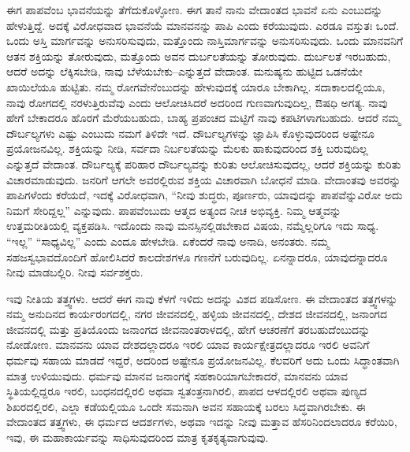 ಈಗ ಪಾಪವೆಂಬ ಭಾವನೆಯನ್ನು ತೆಗೆದುಕೊಳ್ಳೋಣ. ಈಗ ತಾನೆ ನಾನು ವೇದಾಂತದ ಭಾವನೆ ಏನು ಎಂಬುದನ್ನು ಹೇಳುತ್ತಿದ್ದೆ. ಅದಕ್ಕೆ ವಿರೋಧವಾದ ಭಾವನೆಯೆ ಮಾನವನನ್ನು ಪಾಪಿ ಎಂದು ಕರೆಯುವುದು. ಎರಡೂ ವಸ್ತುತಃ ಒಂದೆ. ಒಂದು ಅಸ್ತಿ ಮಾರ್ಗವನ್ನು ಅನುಸರಿಸುವುದು, ಮತ್ತೊಂದು ನಾಸ್ತಿಮಾರ್ಗವನ್ನು ಅನುಸರಿಸುವುದು. ಒಂದು ಮಾನವನಿಗೆ ಆತನ ಶಕ್ತಿಯನ್ನು ತೋರುವುದು, ಮತ್ತೊಂದು ಅವನ ದುರ್ಬಲತೆಯನ್ನು ತೋರುವುದು. ದುರ್ಬಲತೆ ಇರಬಹುದು, ಆದರೆ ಅದನ್ನು ಲೆಕ್ಕಿಸಬೇಡಿ, ನಾವು ಬೆಳೆಯಬೇಕು–ಎನ್ನುತ್ತದೆ ವೇದಾಂತ. ಮನುಷ್ಯನು ಹುಟ್ಟಿದ ಒಡನೆಯೇ ಖಾಯಿಲೆಯೂ ಹುಟ್ಟಿತು. ನಮ್ಮ ರೋಗವೇನೆಂಬುದನ್ನು ಹೇಳುವುದಕ್ಕೆ ಯಾರೂ ಬೇಕಾಗಿಲ್ಲ. ಸದಾಕಾಲದಲ್ಲಿಯೂ, ನಾವು ರೋಗದಲ್ಲಿ ನರಳುತ್ತಿರುವೆವು ಎಂದು ಆಲೋಚಿಸಿದರೆ ಅದರಿಂದ ಗುಣವಾಗುವುದಿಲ್ಲ, ಔಷಧಿ ಅಗತ್ಯ. ನಾವು ಹೇಗೆ ಬೇಕಾದರೂ ಹೊರಗೆ ಮೆರೆಯಬಹುದು, ಬಾಹ್ಯ ಪ್ರಪಂಚದ ಮಟ್ಟಿಗೆ ನಾವು ಕಪಟಿಗಳಾಗಬಹುದು. ಆದರೆ ನಮ್ಮ ದೌರ್ಬಲ್ಯಗಳು ಎಷ್ಟು ಎಂಬುದು ನಮಗೆ ತಿಳಿದೇ ಇದೆ. ದೌರ್ಬಲ್ಯಗಳನ್ನು ಜ್ಞಾಪಿಸಿ ಕೊಳ್ಳುವುದರಿಂದ ಅಷ್ಟೇನೂ ಪ್ರಯೋಜನವಿಲ್ಲ. ಶಕ್ತಿಯನ್ನು ನೀಡಿ, ಸರ್ವದಾ ನಿರ್ಬಲತೆಯನ್ನು ಮೆಲಕು ಹಾಕುವುದರಿಂದ ಶಕ್ತಿ ಬರುವುದಿಲ್ಲ ಎನ್ನುತ್ತದೆ ವೇದಾಂತ. ದೌರ್ಬಲ್ಯಕ್ಕೆ ಪರಿಹಾರ ದೌರ್ಬಲ್ಯವನ್ನು ಕುರಿತು ಆಲೋಚಿಸುವುದಲ್ಲ, ಆದರೆ ಶಕ್ತಿಯನ್ನು ಕುರಿತು ವಿಚಾರಮಾಡುವುದು. ಜನರಿಗೆ ಆಗಲೇ ಅವರಲ್ಲಿರುವ ಶಕ್ತಿಯ ವಿಚಾರವಾಗಿ ಬೋಧನೆ ಮಾಡಿ. ವೇದಾಂತವು ಅವರನ್ನು ಪಾಪಿಗಳೆಂದು ಕರೆಯದೆ, ಇದಕ್ಕೆ ವಿರೋಧವಾಗಿ, “ನೀವು ಶುದ್ಧರು, ಪೂರ್ಣರು, ಯಾವುದನ್ನು ಪಾಪವೆನ್ನುವಿರೋ ಅದು ನಿಮಗೆ ಸೇರಿದ್ದಲ್ಲ” ಎನ್ನುವುದು. ಪಾಪವೆಂಬುದು ಆತ್ಮದ ಅತ್ಯಂದ ನೀಚ ಅಭಿವ್ಯಕ್ತಿ. ನಿಮ್ಮ ಆತ್ಮವನ್ನು ಉತ್ತಮರೀತಿಯಲ್ಲಿ ವ್ಯಕ್ತಪಡಿಸಿ. ಇದೊಂದು ನಾವು ಮನಸ್ಸಿನಲ್ಲಿಡಬೇಕಾದ ವಿಷಯ, ನಮ್ಮೆಲ್ಲರಿಗೂ ಇದು ಸಾಧ್ಯ. “ಇಲ್ಲ” “ಸಾಧ್ಯವಿಲ್ಲ” ಎಂದು ಎಂದೂ ಹೇಳಬೇಡಿ. ಏಕೆಂದರೆ ನಾವು ಅನಾದಿ, ಅನಂತರು. ನಮ್ಮ ಸಹಜಸ್ವಭಾವದೊಂದಿಗೆ ಹೋಲಿಸಿದರೆ ಕಾಲದೇಶಗಳೂ ಗಣನೆಗೆ ಬರುವುದಿಲ್ಲ. ಏನನ್ನಾದರೂ, ಯಾವುದನ್ನಾದರೂ ನೀವು ಮಾಡಬಲ್ಲಿರಿ. ನೀವು ಸರ್ವಶಕ್ತರು. 

\vskip 9pt

ಇವು ನೀತಿಯ ತತ್ತ್ವಗಳು. ಆದರೆ ಈಗ ನಾವು ಕೆಳಗೆ ಇಳಿದು ಅದನ್ನು ವಿಶದ ಪಡಿಸೋಣ. ಈ ವೇದಾಂತದ ತತ್ತ್ವಗಳನ್ನು ನಮ್ಮ ಅನುದಿನದ ಕಾರ್ಯರಂಗದಲ್ಲಿ, ನಗರ ಜೀವನದಲ್ಲಿ, ಹಳ್ಳಿಯ ಜೀವನದಲ್ಲಿ, ದೇಶದ ಜೀವನದಲ್ಲಿ, ಜನಾಂಗದ ಜೀವನದಲ್ಲಿ ಮತ್ತು ಪ್ರತಿಯೊಂದು ಜನಾಂಗದ ಜೀವನಾಂತರಾಳದಲ್ಲಿ, ಹೇಗೆ ಆಚರಣೆಗೆ ತರಬಹುದೆಂಬುದನ್ನು ನೋಡೋಣ. ಮಾನವನು ಯಾವ ದೇಶದಲ್ಲಾದರೂ ಇರಲಿ ಯಾವ ಕಾರ್ಯಕ್ಷೇತ್ರದಲ್ಲಾದರೂ ಇರಲಿ ಅವನಿಗೆ ಧರ್ಮವು ಸಹಾಯ ಮಾಡದೆ ಇದ್ದರೆ, ಅದರಿಂದ ಅಷ್ಟೇನೂ ಪ್ರಯೋಜನವಿಲ್ಲ. ಕೆಲವರಿಗೆ ಅದು ಒಂದು ಸಿದ್ಧಾಂತವಾಗಿ ಮಾತ್ರ ಉಳಿಯುವುದು. ಧರ್ಮವು ಮಾನವ ಜನಾಂಗಕ್ಕೆ ಸಹಕಾರಿಯಾಗಬೇಕಾದರೆ, ಮಾನವನು ಯಾವ ಸ್ಥಿತಿಯಲ್ಲಿದ್ದರೂ ಇರಲಿ, ಬಂಧನದಲ್ಲಿರಲಿ ಅಥವಾ ಸ್ವತಂತ್ರನಾಗಿರಲಿ, ಪಾಪದ ಆಳದಲ್ಲಿರಲಿ ಅಥವಾ ಪುಣ್ಯದ ಶಿಖರದಲ್ಲಿರಲಿ, ಎಲ್ಲಾ ಕಡೆಯಲ್ಲಿಯೂ ಒಂದೇ ಸಮನಾಗಿ ಅವನ ಸಹಾಯಕ್ಕೆ ಬರಲು ಸಿದ್ಧವಾಗಿರಬೇಕು. ಈ ವೇದಾಂತದ ತತ್ತ್ವಗಳು, ಈ ಧರ್ಮದ ಆದರ್ಶಗಳು, ಅಥವಾ ಇದನ್ನು ನೀವು ಮತ್ತಾವ ಹೆಸರಿನಿಂದಲಾದರೂ ಕರೆಯಿರಿ, ಇವು, ಈ ಮಹಾಕಾರ್ಯವನ್ನು ಸಾಧಿಸುವುದರಿಂದ ಮಾತ್ರ ಕೃತಕೃತ್ಯವಾಗುವುವು. 

\vskip 9pt

